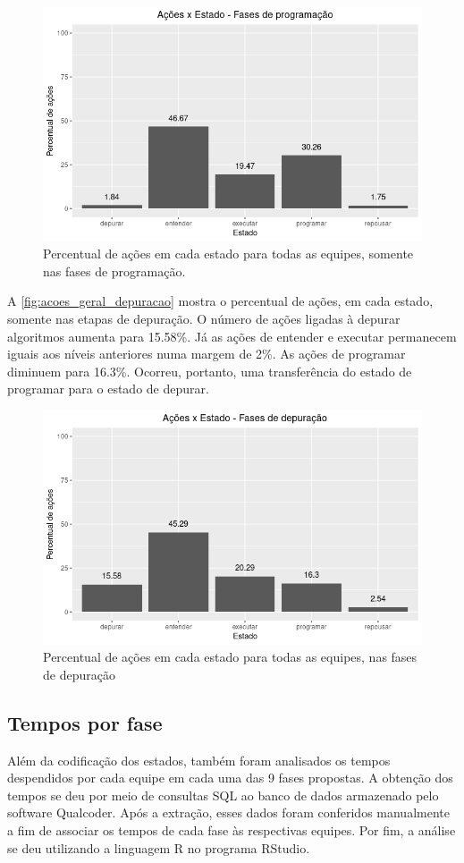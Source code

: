 \begin{figure}[!htpb]
    \centering
    \includegraphics[width=.6\linewidth,fbox]{figs/graficos/acoes_geral_programacao.png}
    \caption{Percentual de ações em cada estado para todas as equipes, somente nas fases de programação.}
    \sourceauthor
    \label{fig:acoes_geral_programacao}
\end{figure}

A \autoref{fig:acoes_geral_depuracao} mostra o percentual de ações, em cada estado, somente nas etapas de depuração. O número de ações ligadas à depurar algoritmos aumenta para 15.58\%. Já as ações de entender e executar permanecem iguais aos níveis anteriores numa margem de 2\%. As ações de programar diminuem para 16.3\%. Ocorreu, portanto, uma transferência do estado de programar para o estado de depurar. 

\begin{figure}[!htpb]
    \centering
    \includegraphics[width=.6\linewidth,fbox]{figs/graficos/acoes_geral_depuracao.png}
    \caption{Percentual de ações em cada estado para todas as equipes, nas fases de depuração}
    \sourceauthor
    \label{fig:acoes_geral_depuracao}
\end{figure}

 \subsection{Tempos por fase}

Além da codificação dos estados, também foram analisados os tempos despendidos por cada equipe em cada uma das 9 fases propostas. A obtenção dos tempos se deu por meio de consultas SQL ao banco de dados armazenado pelo software Qualcoder. Após a extração, esses dados foram conferidos manualmente a fim de associar os tempos de cada fase às respectivas equipes. Por fim, a análise se deu utilizando a linguagem R no programa RStudio. 

